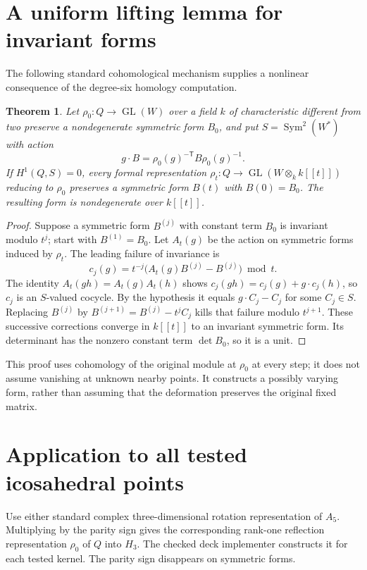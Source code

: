 \documentclass[11pt]{article}
\newtheorem{theorem}{Theorem}
\newcommand{\Sym}{\operatorname{Sym}}
\newcommand{\GL}{\operatorname{GL}}
\begin{document}
\section{A uniform lifting lemma for invariant forms}

The following standard cohomological mechanism supplies a nonlinear
consequence of the degree-six homology computation.

\begin{theorem}\label{thm:forms}
Let $\rho_0:Q\to\GL(W)$ over a field $k$ of characteristic different
from two preserve a nondegenerate
symmetric form $B_0$, and put $S=\Sym^2(W^*)$ with action
\[
                    g\cdot B=\rho_0(g)^{-\mathsf T}B\rho_0(g)^{-1}.
\]
If $H^1(Q,S)=0$, every formal representation
$\rho_t:Q\to\GL(W\otimes_k k[[t]])$ reducing to $\rho_0$
preserves a symmetric form $B(t)$ with $B(0)=B_0$.
The resulting form is nondegenerate over $k[[t]]$.
\end{theorem}
\begin{proof}
Suppose a symmetric form $B^{(j)}$ with constant term $B_0$ is
invariant modulo $t^j$; start with $B^{(1)}=B_0$. Let $A_t(g)$ be
the action on symmetric forms induced by $\rho_t$. The leading
failure of invariance is
\[
              c_j(g)=t^{-j}\bigl(A_t(g)B^{(j)}-B^{(j)}\bigr)\bmod t.
\]
The identity $A_t(gh)=A_t(g)A_t(h)$ shows
$c_j(gh)=c_j(g)+g\cdot c_j(h)$, so $c_j$ is an $S$-valued
cocycle. By the hypothesis it equals $g\cdot C_j-C_j$ for some
$C_j\in S$. Replacing $B^{(j)}$ by
$B^{(j+1)}=B^{(j)}-t^jC_j$ kills that failure modulo $t^{j+1}$.
These successive corrections converge in $k[[t]]$ to an invariant
symmetric form. Its determinant has the nonzero constant term
$\det B_0$, so it is a unit.
\end{proof}

This proof uses cohomology of the original module at $\rho_0$ at
every step; it does not assume vanishing at unknown nearby points.
It constructs a possibly varying form, rather than assuming that
the deformation preserves the original fixed matrix.

\section{Application to all tested icosahedral points}

Use either standard complex three-dimensional rotation representation
of $A_5$. Multiplying by the parity sign gives the corresponding
rank-one reflection representation $\rho_0$ of $Q$ into $H_3$.
The checked deck implementer constructs it for each tested kernel.
The parity sign disappears on symmetric forms.
\end{document}
